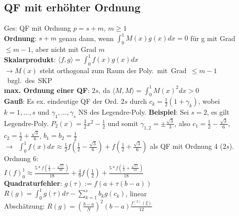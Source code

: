 \subsection{QF mit erhöhter Ordnung}
Ges: QF mit Ordnung $p = s + m$, $m \geq 1$\\
\textbf{Ordnung}: $s+m$ genau dann, wenn $\int_0^1M(x)g(x)dx = 0$ für g mit Grad $\leq m-1$, aber nicht mit Grad $m$\\
\textbf{Skalarprodukt}: $\langle f , g \rangle = \int_0^1f(x)g(x)dx$\\
$\rightarrow M(x)$ steht orthogonal zum Raum der \mbox{Poly. mit Grad $\leq m -1$ bzgl. des SKP}\\
\textbf{max. Ordnung einer QF}: $2s$, da  $\langle M , M \rangle = \int_0^1 M(x)^2dx > 0$\\
\textbf{Gauß}: Es ex. eindeutige QF der Ord. $2s$ durch $c_k = \frac{1}{2}(1 + \gamma_k)$, wobei $k = 1,...,s$ und $\gamma_1, ..., \gamma_s$ NS des Legendre-Poly.
\textbf{Beispiel}: Sei $s = 2$, es gilt Legendre-Poly. $P_2(x) = \frac{3}{2}x^2 - \frac{1}{2}$ und somit $\gamma_{1,2} = \pm \frac{\sqrt{3}}{3}$, also $c_1 = \frac{1}{2}-\frac{\sqrt{3}}{6}$, $c_2 = \frac{1}{2}+\frac{\sqrt{3}}{6}$, $b_1 = b_2 = \frac{1}{2}$\\
\mbox{$\rightarrow$ $\int_0^1f(x)dx \approx \frac{1}{2}f(\frac{1}{2}-\frac{\sqrt{3}}{6}) + f(\frac{1}{2}+\frac{\sqrt{3}}{6})$} als QF mit Ordnung 4 ($2s$). Ordnung 6:\\
$I(f)_0^1\approx \frac{5 * f(\frac{1}{2} - \frac{\sqrt{15}}{10})}{18} + \frac{4}{9}f(\frac{1}{2}) + \frac{5 * f(\frac{1}{2} + \frac{\sqrt{15}}{10})}{18}$\\
\textbf{Quadraturfehler}:  $g(\tau) := f(a + \tau(b-a))$\\
$R(g) = \int_0^1 g(\tau)d\tau - \sum_{k=1}^s b_kg(c_k)$, linear\\
Abschätzung: $R(g) = (\frac{b-a}{N})^2 (b-a) \frac{f^{(2)}(\xi)}{12}$
